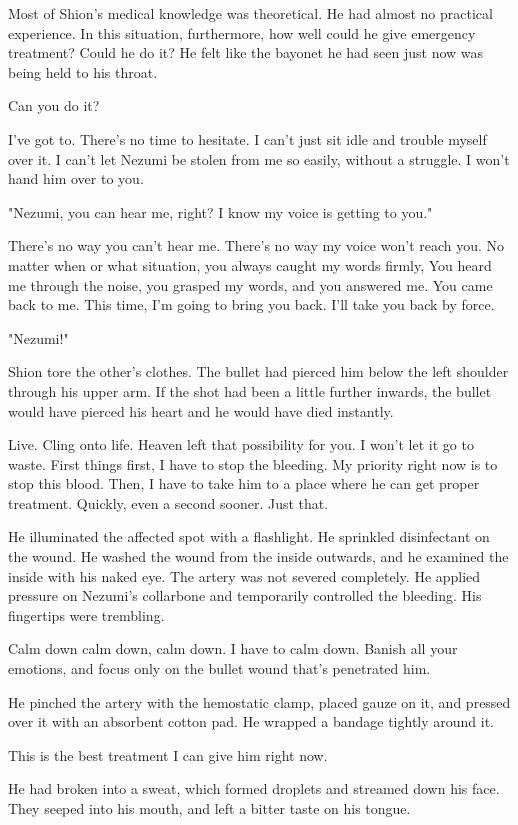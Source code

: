 Most of Shion's medical knowledge was theoretical. He had almost no
practical experience. In this situation, furthermore, how well could he
give emergency treatment? Could he do it? He felt like the bayonet he
had seen just now was being held to his throat.

Can you do it?

I've got to. There's no time to hesitate. I can't just sit idle and
trouble myself over it. I can't let Nezumi be stolen from me so easily,
without a struggle. I won't hand him over to you.

"Nezumi, you can hear me, right? I know my voice is getting to you."

There's no way you can't hear me. There's no way my voice won't reach
you. No matter when or what situation, you always caught my words
firmly, You heard me through the noise, you grasped my words, and you
answered me. You came back to me. This time, I'm going to bring you
back. I'll take you back by force.

"Nezumi!"

Shion tore the other's clothes. The bullet had pierced him below the
left shoulder through his upper arm. If the shot had been a little
further inwards, the bullet would have pierced his heart and he would
have died instantly.

Live. Cling onto life. Heaven left that possibility for you. I won't let
it go to waste. First things first, I have to stop the bleeding. My
priority right now is to stop this blood. Then, I have to take him to a
place where he can get proper treatment. Quickly, even a second sooner.
Just that.

He illuminated the affected spot with a flashlight. He sprinkled
disinfectant on the wound. He washed the wound from the inside outwards,
and he examined the inside with his naked eye. The artery was not
severed completely. He applied pressure on Nezumi's collarbone and
temporarily controlled the bleeding. His fingertips were trembling.

Calm down calm down, calm down. I have to calm down. Banish all your
emotions, and focus only on the bullet wound that's penetrated him.

He pinched the artery with the hemostatic clamp, placed gauze on it, and
pressed over it with an absorbent cotton pad. He wrapped a bandage
tightly around it.

This is the best treatment I can give him right now.

He had broken into a sweat, which formed droplets and streamed down his
face. They seeped into his mouth, and left a bitter taste on his tongue.


